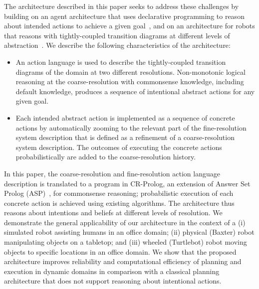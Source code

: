 \documentclass[letterpaper, 10 pt, conference]{article}  %
\begin{document}

The architecture described in this paper seeks to address these
challenges by building on an agent architecture that uses declarative
programming to reason about intended actions to achieve a given
goal~\cite{blount2015theory}, and on an architecture for robots that
reasons with tightly-coupled transition diagrams at different levels
of abstraction~\cite{sridharan2017refinement}. We describe the
following characteristics of the architecture:
\begin{itemize}
\item An action language is used to describe the tightly-coupled
  transition diagrams of the domain at two different resolutions.
  Non-monotonic logical reasoning at the coarse-resolution with
  commonsense knowledge, including default knowledge, produces a
  sequence of intentional abstract actions for any given goal.

\item Each intended abstract action is implemented as a sequence of
  concrete actions by automatically zooming to the relevant part of
  the fine-resolution system description that is defined as a
  refinement of a coarse-resolution system description. The outcomes
  of executing the concrete actions probabilistically are added to the
  coarse-resolution history.
\end{itemize}
In this paper, the coarse-resolution and fine-resolution action
language description is translated to a program in CR-Prolog, an
extension of Answer Set Prolog (ASP)~\cite{gelfond2014knowledge}, for
commonsense reasoning; probabilistic execution of each concrete action
is achieved using existing algorithms. The architecture thus reasons
about intentions and beliefs at different levels of resolution. We
demonstrate the general applicability of our architecture in the
context of a (i) simulated robot assisting humans in an office domain;
(ii) physical (Baxter) robot manipulating objects on a tabletop; and
(iii) wheeled (Turtlebot) robot moving objects to specific locations
in an office domain. We show that the proposed architecture improves
reliability and computational efficiency of planning and execution in
dynamic domains in comparison with a classical planning architecture
that does not support reasoning about intentional actions.
\end{document}
